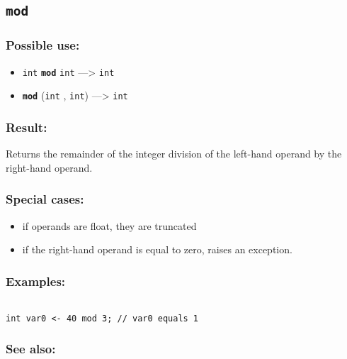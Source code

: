 \documentclass[]{book}
\providecommand{\tightlist}{%
  \setlength{\itemsep}{0pt}\setlength{\parskip}{0pt}}
\theoremstyle{definition}
\theoremstyle{definition}
\theoremstyle{definition}
\theoremstyle{remark}
\begin{document}
\subsection{\texorpdfstring{\texttt{mod}}{mod}}\label{mod}

\subsubsection{Possible use:}\label{possible-use-360}

\begin{itemize}
\tightlist
\item
  \texttt{int} \textbf{\texttt{mod}} \texttt{int} ---\textgreater{}
  \texttt{int}
\item
  \textbf{\texttt{mod}} (\texttt{int} , \texttt{int}) ---\textgreater{}
  \texttt{int}
\end{itemize}

\subsubsection{Result:}\label{result-349}

Returns the remainder of the integer division of the left-hand operand
by the right-hand operand.

\subsubsection{Special cases:}\label{special-cases-100}

\begin{itemize}
\tightlist
\item
  if operands are float, they are truncated\\
\item
  if the right-hand operand is equal to zero, raises an exception.
\end{itemize}

\subsubsection{Examples:}\label{examples-250}

\begin{verbatim}
 
int var0 <- 40 mod 3; // var0 equals 1
\end{verbatim}

\subsubsection{See also:}\label{see-also-143}
\end{document}
